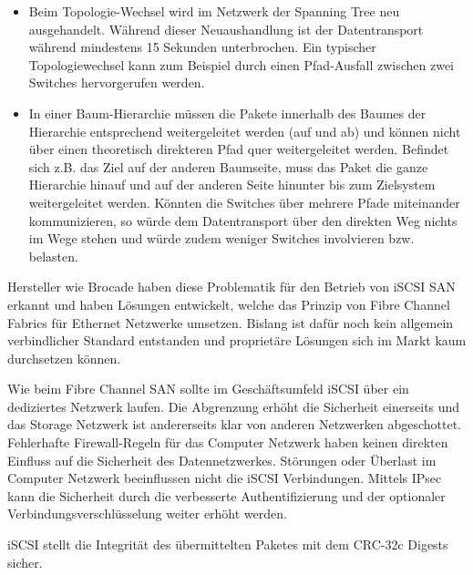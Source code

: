 \begin{itemize}
\item Beim Topologie-Wechsel wird im Netzwerk der Spanning Tree neu ausgehandelt. Während dieser Neuaushandlung ist der Datentransport während mindestens 15 Sekunden unterbrochen. Ein typischer Topologiewechsel kann zum Beispiel durch einen Pfad-Ausfall zwischen zwei Switches hervorgerufen werden.

\item In einer Baum-Hierarchie müssen die Pakete innerhalb des Baumes der Hierarchie entsprechend weitergeleitet werden (auf und ab) und können nicht über einen theoretisch direkteren Pfad quer weitergeleitet werden. Befindet sich z.B. das Ziel auf der anderen Baumseite, muss das Paket die ganze Hierarchie hinauf und auf der anderen Seite hinunter bis zum Zielsystem weitergeleitet werden. Könnten die Switches über mehrere Pfade miteinander kommunizieren, so würde dem Datentransport über den direkten Weg nichts im Wege stehen und würde zudem weniger Switches involvieren bzw. belasten.
\end{itemize}

Hersteller wie Brocade haben diese Problematik für den Betrieb von iSCSI SAN erkannt und haben Lösungen entwickelt, welche das Prinzip von Fibre Channel Fabrics für Ethernet Netzwerke umsetzen. Bislang ist dafür noch kein allgemein verbindlicher Standard entstanden und proprietäre Lösungen sich im Markt kaum durchsetzen können.

Wie beim Fibre Channel SAN sollte im Geschäftsumfeld iSCSI über ein dediziertes Netzwerk laufen. Die Abgrenzung erhöht die Sicherheit einerseits und das Storage Netzwerk ist andererseits klar von anderen Netzwerken abgeschottet. Fehlerhafte Firewall-Regeln für das Computer Netzwerk haben keinen direkten Einfluss auf die Sicherheit des Datennetzwerkes. Störungen oder Überlast im Computer Netzwerk beeinflussen nicht die iSCSI Verbindungen. Mittels IPsec kann die Sicherheit durch die verbesserte Authentifizierung und der optionaler Verbindungsverschlüsselung weiter erhöht werden. 

iSCSI stellt die Integrität des übermittelten Paketes mit dem CRC-32c Digests sicher. 

